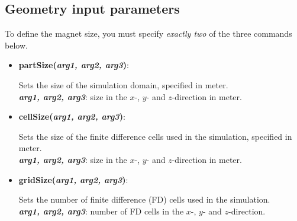 \subsection{Geometry input parameters}
To define the magnet size, you must specify \emph{exactly two} of the three commands below.

\begin{itemize}
 \item {\textbf{partSize(\textit{arg1, arg2, arg3})}:
				\flushright\parbox{0.9 \textwidth}{\vspace{-0.25cm} 
				Sets the size of the simulation domain, specified in meter.\\
				\textbf{\textit{arg1, arg2, arg3}}: size in the $x$-, $y$- and $z$-direction in meter.\\
				}\flushleft}

 \item {\vspace{-0.4cm}\textbf{cellSize(\textit{arg1, arg2, arg3})}:
				\flushright\parbox{0.9 \textwidth}{\vspace{-0.25cm} 
				Sets the size of the finite difference cells used in the simulation, specified in meter.\\
				\textbf{\textit{arg1, arg2, arg3}}: size in the $x$-, $y$- and $z$-direction in meter.
				}\flushleft}

 \item {\vspace{-0.4cm}\textbf{gridSize(\textit{arg1, arg2, arg3})}:
				\flushright\parbox{0.9 \textwidth}{\vspace{-0.25cm} 
				Sets the number of finite difference (FD) cells used in the simulation.\\
				\textbf{\textit{arg1, arg2, arg3}}: number of FD cells in the $x$-, $y$- and $z$-direction.
				}\flushleft}

\end{itemize}


